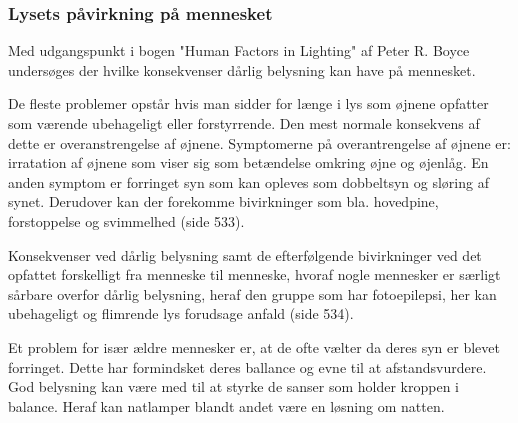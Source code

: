 \subsubsection{Lysets påvirkning på mennesket} 
\label{sec:konsekvenser}

Med udgangspunkt i bogen "Human Factors in Lighting" af Peter R. Boyce undersøges der hvilke konsekvenser dårlig belysning kan have på mennesket. 

De fleste problemer opstår hvis man sidder for længe i lys som øjnene opfatter som værende ubehageligt eller forstyrrende. Den mest normale konsekvens af dette er overanstrengelse af øjnene. Symptomerne på overantrengelse af øjnene er: irratation af øjnene som viser sig som betændelse omkring øjne og øjenlåg. En anden symptom er forringet syn som kan opleves som dobbeltsyn og sløring af synet. Derudover kan der forekomme bivirkninger som bla. hovedpine, forstoppelse og svimmelhed \cite{human_factors}(side 533).

Konsekvenser ved dårlig belysning samt de efterfølgende bivirkninger ved det opfattet forskelligt fra menneske til menneske, hvoraf nogle mennesker er særligt sårbare overfor dårlig belysning, heraf den gruppe som har fotoepilepsi, her kan ubehageligt og flimrende lys forudsage anfald \cite{human_factors}(side 534). 

Et problem for især ældre mennesker er, at de ofte vælter da deres syn er blevet forringet. Dette har formindsket deres ballance og evne til at afstandsvurdere. God belysning kan være med til at styrke de sanser som holder kroppen i balance. Heraf kan natlamper blandt andet være en løsning om natten. 